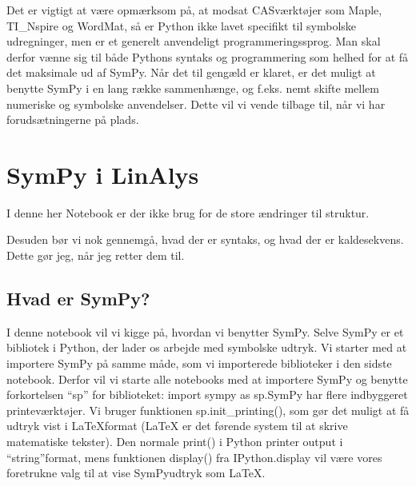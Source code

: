 \documentclass[letterpaper,10pt,english]{jupyterBook}
\begin{document}
Det er vigtigt at være opmærksom på, at modsat CAS\sphinxhyphen{}værktøjer som Maple, TI\_Nspire og WordMat, så er Python ikke lavet specifikt til symbolske udregninger, men er et generelt anvendeligt programmeringssprog. Man skal derfor vænne sig til både Pythons syntaks og programmering som helhed for at få det maksimale ud af SymPy. Når det til gengæld er klaret, er det muligt at benytte SymPy i en lang række sammenhænge, og f.eks. nemt skifte mellem numeriske og symbolske anvendelser. Dette vil vi vende tilbage til, når vi har forudsætningerne på plads.


\section{SymPy i LinAlys}
\label{\detokenize{notebooks/sympy/Notebook2:sympy-i-linalys}}\label{\detokenize{notebooks/sympy/Notebook2::doc}}
I denne her Notebook er der ikke brug for de store ændringer til struktur.

Desuden bør vi nok gennemgå, hvad der er syntaks, og hvad der er kaldesekvens. Dette gør jeg, når jeg retter dem til.


\subsection{Hvad er SymPy?}
\label{\detokenize{notebooks/sympy/Notebook2:hvad-er-sympy}}
I denne notebook vil vi kigge på, hvordan vi benytter SymPy. Selve SymPy er et bibliotek i Python, der lader os arbejde med symbolske udtryk. Vi starter med at importere SymPy på samme måde, som vi importerede  biblioteker i den sidste notebook. Derfor vil vi starte alle notebooks med at importere SymPy og benytte forkortelsen “sp” for biblioteket: import sympy as sp.SymPy har flere indbyggeret printe\sphinxhyphen{}værktøjer. Vi bruger funktionen sp.init\_printing(), som gør det muligt at få udtryk vist i LaTeX\sphinxhyphen{}format (LaTeX er det førende system til at skrive matematiske tekster).
Den normale print() i Python printer output i “string”\sphinxhyphen{}format, mens funktionen display() fra IPython.display vil være vores foretrukne valg til at vise SymPy\sphinxhyphen{}udtryk som LaTeX.

\begin{sphinxVerbatim}[commandchars=\\\{\}]
                       
\end{sphinxVerbatim}
\end{document}
